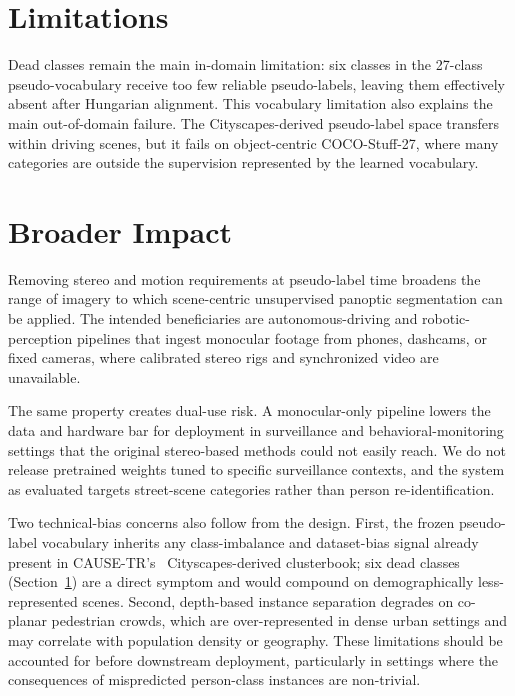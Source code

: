 \documentclass[10pt,twocolumn,letterpaper]{article}
\begin{document}
\section{Limitations}
\label{sec:limitations}

\noindent Dead classes remain the main in-domain limitation: six classes in the 27-class pseudo-vocabulary receive too few reliable pseudo-labels, leaving them effectively absent after Hungarian alignment. This vocabulary limitation also explains the main out-of-domain failure. The Cityscapes-derived pseudo-label space transfers within driving scenes, but it fails on object-centric COCO-Stuff-27, where many categories are outside the supervision represented by the learned vocabulary.


\section{Broader Impact}
\label{sec:impact}

\noindent Removing stereo and motion requirements at pseudo-label time broadens the range of imagery to which scene-centric unsupervised panoptic segmentation can be applied. The intended beneficiaries are autonomous-driving and robotic-perception pipelines that ingest monocular footage from phones, dashcams, or fixed cameras, where calibrated stereo rigs and synchronized video are unavailable.

The same property creates dual-use risk. A monocular-only pipeline lowers the data and hardware bar for deployment in surveillance and behavioral-monitoring settings that the original stereo-based methods could not easily reach. We do not release pretrained weights tuned to specific surveillance contexts, and the system as evaluated targets street-scene categories rather than person re-identification.

Two technical-bias concerns also follow from the design. First, the frozen pseudo-label vocabulary inherits any class-imbalance and dataset-bias signal already present in CAUSE-TR's~\cite{kim2024cause} Cityscapes-derived clusterbook; six dead classes (Section~\ref{sec:limitations}) are a direct symptom and would compound on demographically less-represented scenes. Second, depth-based instance separation degrades on co-planar pedestrian crowds, which are over-represented in dense urban settings and may correlate with population density or geography. These limitations should be accounted for before downstream deployment, particularly in settings where the consequences of mispredicted person-class instances are non-trivial.
\end{document}
